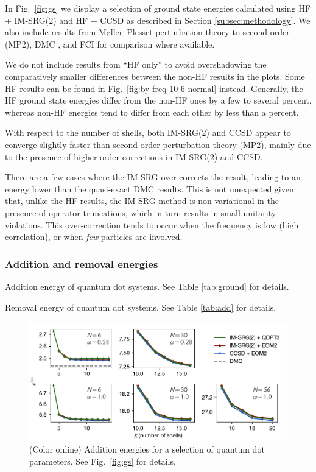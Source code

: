 In Fig.\ \ref{fig:gs} we display a selection of ground state energies calculated using HF + IM-SRG(2) and HF + CCSD as described in Section \ref{subsec:methodology}.  We also include results from M\o ller--Plesset perturbation theory to second order (MP2), DMC \cite{hoegberget2013thesis}, and FCI \cite{olsen2013thesis} for comparison where available.

We do not include results from ``HF only'' to avoid overshadowing the comparatively smaller differences between the non-HF results in the plots.  Some HF results can be found in Fig.\ \ref{fig:by-freq-10-6-normal} instead.  Generally, the HF ground state energies differ from the non-HF ones by a few to several percent, whereas non-HF energies tend to differ from each other by less than a percent.

With respect to the number of shells, both IM-SRG(2) and CCSD appear to converge slightly faster than second order perturbation theory (MP2), mainly due to the presence of higher order corrections in IM-SRG(2) and CCSD.

There are a few cases where the IM-SRG over-corrects the result, leading to an energy lower than the quasi-exact DMC results.  This is not unexpected given that, unlike the HF results, the IM-SRG method is non-variational in the presence of operator truncations, which in turn results in small unitarity violations.  This over-correction tends to occur when the frequency is low (high correlation), or when \emph{few} particles are involved.

\subsubsection{Addition and removal energies}

\begin{table}
  \centering
  \caption{Addition energy of quantum dot systems.  See Table \ref{tab:ground} for details.}
  \label{tab:add}
  
\end{table}

\begin{table}
  \centering
  \caption{Removal energy of quantum dot systems.  See Table \ref{tab:add} for details.}
  \label{tab:rm}
  
\end{table}

\begin{figure}
  \centering
  \includegraphics{fig-add2.pdf}
  \caption{(Color online) Addition energies for a selection of quantum dot parameters.  See Fig.\ \ref{fig:gs} for details.}
  \label{fig:add}
\end{figure}

